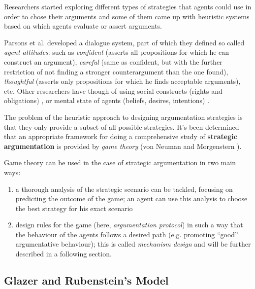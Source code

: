 \documentclass[12pt, a4paper]{article}
\begin{document}
Researchers started exploring different types of strategies that agents could
use in order to chose their arguments and some of them came up with heuristic
systems based on which agents evaluate or assert arguments.

Parsons et al. \cite{parson} developed a dialogue system, part of which they
defined so called \emph{agent attitudes}: such as \emph{confident} (asserts all
propositions for which he can construct an argument), \emph{careful} (same as
confident, but with the further restriction of not finding a stronger
counterargument than the one found), \emph{thoughtful} (asserts only
propositions for which he finds acceptable arguments), etc. Other researchers
have though of using social constructs (rights and obligations) \cite{21}, or
mental state of agents (beliefs, desires, intentions) \cite{22}.

The problem of the heuristic approach to designing argumentation strategies is
that they only provide a subset of all possible strategies. It's been
determined that an appropriate framework for doing a comprehensive study of 
\textbf{strategic argumentation} is provided by \emph{game theory} (von Neuman and 
Morgenstern \cite{55}). 


Game theory can be used in the case of strategic argumentation in two main ways:
\begin{enumerate}
    \item a thorough analysis of the strategic scenario can be tackled,
        focusing on predicting the outcome of the game; an agent can use this
        analysis to choose the best strategy for his exact scenario
    \item design rules for the game (here, \emph{argumentation protocol}) in
        such a way that the behaviour of the agents follows a desired path
        (e.g. promoting ``good'' argumentative behaviour); this is called
        \emph{mechanism design} and will be further described in a following
        section.
\end{enumerate}

\subsection{Glazer and Rubenstein's Model}
\end{document}
